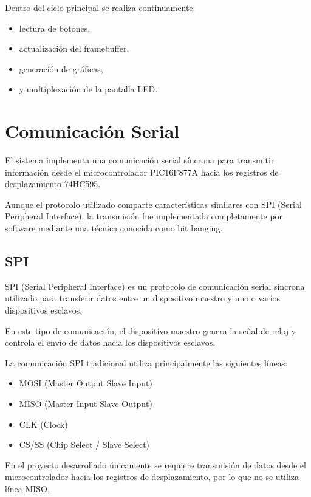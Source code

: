 Dentro del ciclo principal se realiza continuamente:

\begin{itemize}
    \item lectura de botones,
    \item actualización del framebuffer,
    \item generación de gráficas,
    \item y multiplexación de la pantalla LED.
\end{itemize}

\section{Comunicación Serial}

El sistema implementa una comunicación serial síncrona para transmitir información desde el microcontrolador PIC16F877A hacia los registros de desplazamiento 74HC595.

Aunque el protocolo utilizado comparte características similares con SPI (Serial Peripheral Interface), la transmisión fue implementada completamente por software mediante una técnica conocida como bit banging.

\subsection{SPI}

SPI (Serial Peripheral Interface) es un protocolo de comunicación serial síncrona utilizado para transferir datos entre un dispositivo maestro y uno o varios dispositivos esclavos.

En este tipo de comunicación, el dispositivo maestro genera la señal de reloj y controla el envío de datos hacia los dispositivos esclavos.

La comunicación SPI tradicional utiliza principalmente las siguientes líneas:

\begin{itemize}
    \item MOSI (Master Output Slave Input)
    \item MISO (Master Input Slave Output)
    \item CLK (Clock)
    \item CS/SS (Chip Select / Slave Select)
\end{itemize}

En el proyecto desarrollado únicamente se requiere transmisión de datos desde el microcontrolador hacia los registros de desplazamiento, por lo que no se utiliza línea MISO.

